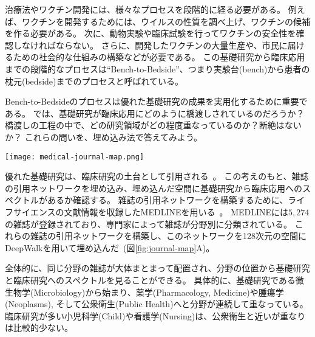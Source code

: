 \documentclass[J]{scitrans}
\begin{document}
治療法やワクチン開発には、様々なプロセスを段階的に経る必要がある。
例えば、ワクチンを開発するためには、ウイルスの性質を調べ上げ、ワクチンの候補を作る必要がある。
次に、動物実験や臨床試験を行ってワクチンの安全性を確認しなければならない。
さらに、開発したワクチンの大量生産や、市民に届けるための社会的な仕組みの構築などが必要である。
この基礎研究から臨床応用までの段階的なプロセスは``Bench-to-Bedside''、つまり実験台(bench)から患者の枕元(bedside)までのプロセスと呼ばれている。

Bench-to-Bedsideのプロセスは優れた基礎研究の成果を実用化するために重要である。
では、基礎研究が臨床応用にどのように橋渡しされているのだろうか？
橋渡しの工程の中で、どの研究領域がどの程度重なっているのか？断絶はないか？
これらの問いを、埋め込み法で答えてみよう。

\begin{figure*}[h!]
    \centering
    \begin{minipage}{\hsize}
        \texttt{[image: medical-journal-map.png]} 
    \end{minipage}
    \caption{
        生命科学分野の雑誌の引用ネットワークの埋め込み。
        MEDLINEに登録されている$5,274$誌を128次元の空間に埋め込んだ。
        {\bf (A)} 可視化のためLDAを用いて2次元面に射影した。LDAに与えるデータ点（雑誌）のラベルとして、National Library of Medicineによる
        雑誌の分野別分類を用いた。
        {\bf (B)} 基礎から臨床までのスペクトル。
        このスペクトルは、基礎研究であるMicrobiologyと、臨床研究であるNursingとChildがなるべく離れるように、埋め込み空間上の全雑誌を直線に射影したものである。
        軸上の雑誌の位置の中央値で分野を降順に並べている。
        {\bf (C)} 基礎と臨床研究の引用ネットワーク。 全雑誌を(B)の軸上の位置で順にならべ、全雑誌を10のグループに等分した。
        円は雑誌のグループを表す。グループ$i$から$j$への矢印は$i$から$j$への引用を表す。
        矢印の幅は引用数を表す。
    }
    \label{fig:journal-map}
\end{figure*}

優れた基礎研究は、臨床研究の土台として引用される~\cite{Weber2013}。
この考えのもと、雑誌の引用ネットワークを埋め込み、埋め込んだ空間に基礎研究から臨床応用へのスペクトルがあるか確認する。
雑誌の引用ネットワークを構築するために、ライフサイエンスの文献情報を収録したMEDLINEを用いる~\cite{MEDLINE}。
MEDLINEには$5,274$の雑誌が登録されており、専門家によって雑誌が分野別に分類されている。
これらの雑誌の引用ネットワークを構築し、このネットワークを128次元の空間にDeepWalkを用いて埋め込んだ~(図\ref{fig:journal-map}A)。

全体的に、同じ分野の雑誌が大体まとまって配置され、分野の位置から基礎研究と臨床研究へのスペクトルを見ることができる。
具体的に、基礎研究である微生物学(Microbiology)から始まり、薬学(Pharmacology, Medicine)や腫瘍学(Neoplasms), そして公衆衛生(Public Health)へと分野が連続して重なっている。
臨床研究が多い小児科学(Child)や看護学(Nursing)は、公衆衛生と近いが重なりは比較的少ない。
 
\end{document}
